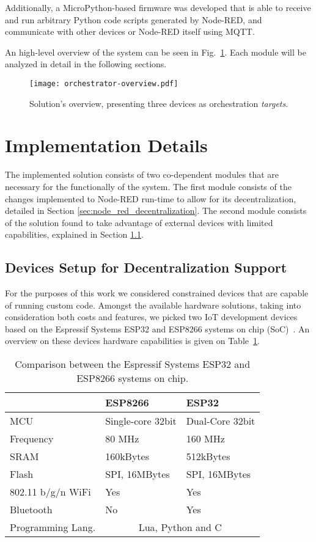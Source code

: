 Additionally, a MicroPython-based firmware was developed that is able to receive and run arbitrary Python code scripts generated by Node-RED, and communicate with other devices or Node-RED itself using MQTT. 

An high-level overview of the system can be seen in Fig.~\ref{fig:solution_overview}. Each module will be analyzed in detail in the following sections.

\begin{figure}[h]
    \centering
    \texttt{[image: orchestrator-overview.pdf]}
    \caption{Solution's overview, presenting three devices as orchestration \textit{targets}.}
    \label{fig:solution_overview}
\end{figure}

\section{Implementation Details}\label{sec:implementation_details}

The implemented solution consists of two co-dependent modules that are necessary for the functionally of the system. The first module consists of the changes implemented to Node-RED run-time to allow for its decentralization, detailed in Section \ref{sec:node_red_decentralization}. The second module consists of the solution found to take advantage of external devices with limited capabilities, explained in Section \ref{sec:devices_decentralization}.

\subsection{Devices Setup for Decentralization Support}\label{sec:devices_decentralization}

For the purposes of this work we considered constrained devices that are capable of running custom code. Amongst the available hardware solutions, taking into consideration both costs and features, we picked two IoT development devices based on the Espressif Systems ESP32 and ESP8266 systems on chip (SoC)~\cite{esp32,esp8266}. An overview on these devices hardware capabilities is given on Table~\ref{tab:esps}.

\begin{table}[h]
\centering
\begin{tabular}{@{}lll@{}}
\toprule
& \textbf{ESP8266} & \textbf{ESP32}\\ \midrule
MCU & Single-core 32bit & Dual-Core 32bit \\
Frequency & 80 MHz & 160 MHz \\
SRAM & 160kBytes & 512kBytes \\
Flash & SPI, 16MBytes & SPI, 16MBytes \\
802.11 b/g/n WiFi & Yes & Yes \\
Bluetooth & No & Yes \\
Programming Lang.  & \multicolumn{2}{c}{Lua, Python and C} \\ \bottomrule
\end{tabular}
\caption{Comparison between the Espressif Systems ESP32 and ESP8266 systems on chip.}
\label{tab:esps}
\end{table}

